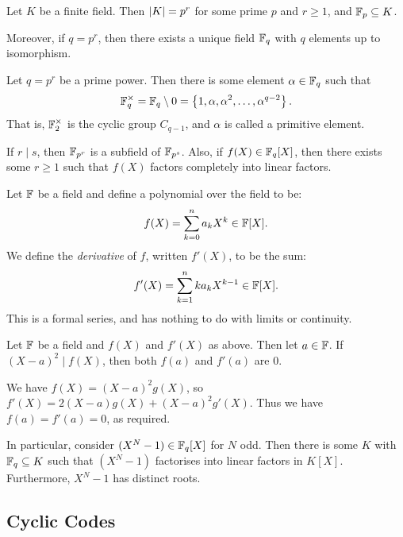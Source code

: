 \documentclass{article}
\begin{document}
\begin{theorem}
    Let $K$ be a finite field. Then $\left\lvert K \right\rvert = p^r$ for some prime $p$ and $r \geq 1$, and $\mathbb{F}_p \subseteq K$.
    
    Moreover, if $q = p^r$, then there exists a unique field $\mathbb{F}_q$ with $q$ elements up to isomorphism.
\end{theorem}

\begin{proposition}[Isomorphism]
    Let $q = p^r$ be a prime power. Then there is some element $\alpha \in \mathbb{F}_q$ such that
    \[
    \mathbb{F}_q^\times = \mathbb{F}_q \setminus 0 = \left\lbrace 1, \alpha, \alpha^2, \dots, \alpha^{q-2} \right\rbrace.
    \]
    That is, $\mathbb{F}_2^\times$ is the cyclic group $C_{q-1}$, and $\alpha$ is called a primitive element.
    
    If $r \mid s$, then $\mathbb{F}_{p^r}$ is a subfield of $\mathbb{F}_{p^s}$. Also, if $f(X) \in \mathbb{F}_q[X]$, then there exists some $r \geq 1$ such that $f(X)$ factors completely into linear factors.
\end{proposition}

\begin{definition}[Derivative]
    Let $\mathbb{F}$ be a field and define a polynomial over the field to be:
    \[
	f(X) = \sum_{k=0}^n a_k X^k \in \mathbb{F}[X].
	\]
	We define the \textit{derivative} of $f$, written $f'(X)$, to be the sum:
	\[
	f'(X) = \sum_{k=1}^n ka_k X^{k-1} \in \mathbb{F}[X].
	\]
	This is a formal series, and has nothing to do with limits or continuity.
\end{definition}

\begin{proposition}[Differentiation]
    Let $\mathbb{F}$ be a field and $f(X)$ and $f'(X)$ as above. Then let $a \in \mathbb{F}$. If $(X-a)^2 \mid f(X)$, then both $f(a)$ and $f'(a)$ are 0.
\end{proposition}

\begin{prf}
    We have $f(X) = (X-a)^2 g(X)$, so $f'(X) = 2(X-a)g(X) + (X-a)^2g'(X)$. Thus we have $f(a) = f'(a) = 0$, as required.
\end{prf}

In particular, consider $(X^N - 1) \in \mathbb{F}_q[X]$ for $N$ odd. Then there is some $K$ with $\mathbb{F}_q \subseteq K$ such that $(X^N-1)$ factorises into linear factors in $K[X]$. Furthermore, $X^N-1$ has distinct roots.


\subsection{Cyclic Codes}
\label{section-algebraic-cyclic-codes}
\end{document}

